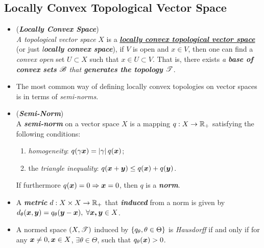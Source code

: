 \documentclass[11pt]{article}
\begin{document}
\subsection{Locally Convex Topological Vector Space}
\begin{itemize}
\item \begin{definition} (\emph{\textbf{Locally Convex Space}})\\
\emph{A topological vector space} $X$ is a \underline{\emph{\textbf{locally convex topological vector space}}} (or just \emph{l\textbf{ocally convex space}}), if $V$ is open and $x \in V$, then one can find a \emph{convex} \emph{open} set $U\subset X$ such that $x \in U\subset V$. That is, there exists \emph{a \textbf{base of convex sets} ${\mathscr B}$ that \textbf{generates the topology} ${\mathscr T}$}. 
\end{definition}

\item \begin{remark}
The most common way of defining locally convex topologies on vector spaces is in terms of \emph{semi-norms}. 
\end{remark}

\item  \begin{definition} (\emph{\textbf{Semi-Norm}})\\
A \emph{\textbf{semi-norm}} on a vector space $X$ is a mapping $q: X\rightarrow {\mathbb R}_{+}$ satisfying the following conditions: 
\begin{enumerate}
\item \emph{homogeneity}: $q(\gamma \boldsymbol{x}) = \left\lvert \gamma \right\rvert q(\boldsymbol{x})$;
\item the \emph{triangle inequality}: $q(\boldsymbol{x}+\boldsymbol{y})\le q(\boldsymbol{x})+ q(\boldsymbol{y})$.
\end{enumerate}
 If furthermore $q(\boldsymbol{x})=0 \Rightarrow \boldsymbol{x}=0$, then $q$ is a \emph{\textbf{norm}}.
\end{definition}

\item \begin{remark}
 A \emph{\textbf{metric}} $d: X\times X \rightarrow {\mathbb R}_{+}$ that \emph{\textbf{induced}} from a norm is given by $d_{\theta}(\boldsymbol{x}, \boldsymbol{y})= q_{\theta}(\boldsymbol{y}-\boldsymbol{x}),\; \forall \boldsymbol{x,y}\in X $.
 \end{remark}

\item \begin{proposition}
A normed space $(X, {\mathscr T})$ induced by $\left\{q_{\theta},\theta\in \Theta\right\}$ is \emph{Hausdorff} if and only if for any $\boldsymbol{x}\neq 0, \boldsymbol{x}\in X$, $\exists \theta\in \Theta$, such that $q_{\theta}(\boldsymbol{x})>0$.
\end{proposition}


\end{itemize}
\end{document}
